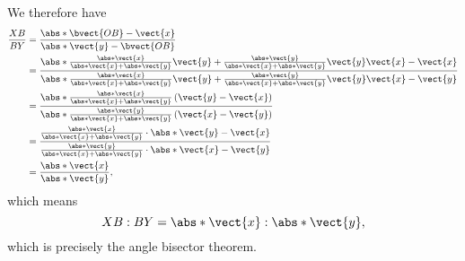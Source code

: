 \begin{enumerate}
\begin{enumerate}
                    We therefore have
                    \begin{align*}
                        \frac{XB}{BY} & = \frac{\abs*{\bvect{OB} - \vect{x}}}{\abs*{\vect{y} - \bvect{OB}}}                                                                                                                                                                                                                                                                             \\
                                      & = \frac{\abs*{\frac{\abs*{\vect{x}}}{\abs*{\vect{x}} + \abs*{\vect{y}}} \vect{y} + \frac{\abs*{\vect{y}}}{\abs*{\vect{x}} + \abs*{\vect{y}}} \vect{y} \vect{x} - \vect{x}}}{\abs*{\frac{\abs*{\vect{x}}}{\abs*{\vect{x}} + \abs*{\vect{y}}} \vect{y} + \frac{\abs*{\vect{y}}}{\abs*{\vect{x}} + \abs*{\vect{y}}} \vect{y} \vect{x} - \vect{y}}} \\
                                      & = \frac{\abs*{\frac{\abs*{\vect{x}}}{\abs*{\vect{x}} + \abs*{\vect{y}}} \left(\vect{y} - \vect{x}\right)}}{\abs*{\frac{\abs*{\vect{y}}}{\abs*{\vect{x}} + \abs*{\vect{y}}} \left(\vect{x} - \vect{y}\right)}}                                                                                                                                   \\
                                      & = \frac{\frac{\abs*{\vect{x}}}{\abs*{\vect{x}} + \abs*{\vect{y}}} \cdot \abs*{\vect{y} - \vect{x}}}{\frac{\abs*{\vect{y}}}{\abs*{\vect{x}} + \abs*{\vect{y}}} \cdot \abs*{\vect{x} - \vect{y}}}                                                                                                                                                 \\
                                      & = \frac{\abs*{\vect{x}}}{\abs*{\vect{y}}},
                    \end{align*}
                    which means
                    \[
                        XB : BY = \abs*{\vect{x}} : \abs*{\vect{y}},
                    \]
                    which is precisely the angle bisector theorem.


\end{enumerate}
\end{enumerate}
